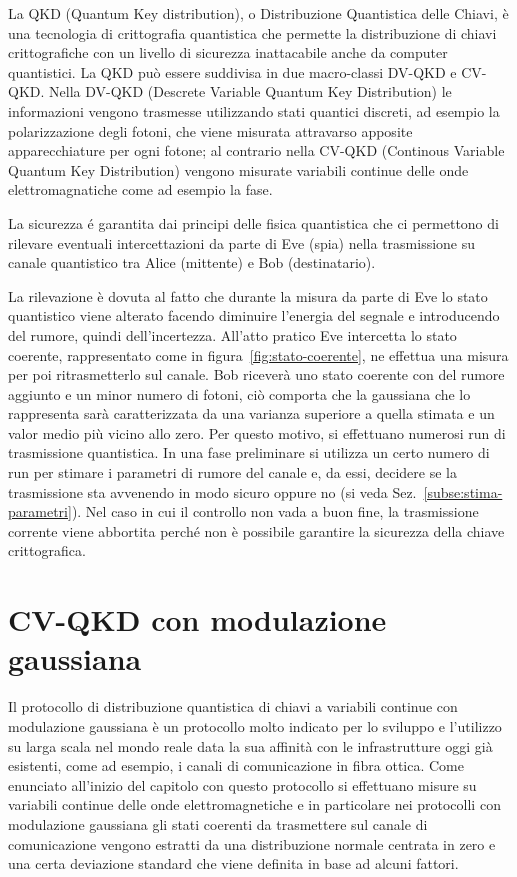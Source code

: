 La QKD (Quantum Key distribution), o Distribuzione Quantistica delle Chiavi, \`e una tecnologia di crittografia quantistica che permette la distribuzione di chiavi crittografiche con un livello di sicurezza inattacabile anche da computer quantistici. La QKD pu\`o essere suddivisa in due macro-classi DV-QKD e CV-QKD. Nella DV-QKD (Descrete Variable Quantum Key Distribution) le informazioni vengono trasmesse utilizzando stati quantici discreti, ad esempio la polarizzazione degli fotoni, che viene misurata attravarso apposite apparecchiature per ogni fotone; al contrario nella CV-QKD (Continous Variable Quantum Key Distribution) vengono misurate variabili continue delle onde elettromagnatiche come ad esempio la fase.

La sicurezza \'e garantita dai principi delle fisica quantistica che ci permettono di rilevare eventuali intercettazioni da parte di Eve (spia) nella trasmissione su canale quantistico tra Alice (mittente) e Bob (destinatario).

La rilevazione \`e dovuta al fatto che durante la misura da parte di Eve lo stato quantistico viene alterato facendo diminuire l'energia del segnale e introducendo del rumore, quindi dell'incertezza. All'atto pratico Eve intercetta lo stato coerente, rappresentato come in figura~\ref{fig:stato-coerente}, ne effettua una misura per poi ritrasmetterlo sul canale. Bob ricever\`a uno stato coerente con del rumore aggiunto e un minor numero di fotoni, ci\`o comporta che la gaussiana che lo rappresenta sar\`a caratterizzata da una varianza superiore a quella stimata e un valor medio pi\`u vicino allo zero. Per questo motivo, si effettuano numerosi run di trasmissione quantistica. In una fase preliminare si utilizza un certo numero di run per stimare i parametri di rumore del canale e, da essi, decidere se la trasmissione sta avvenendo in modo sicuro oppure no (si veda Sez.~\ref{subse:stima-parametri}). Nel caso in cui il controllo non vada a buon fine, la trasmissione  corrente viene abbortita perch\'e non \`e possibile garantire la sicurezza della chiave crittografica.

\section{CV-QKD con modulazione gaussiana}
Il protocollo di distribuzione quantistica di chiavi a variabili continue con modulazione gaussiana \`e un protocollo molto indicato per lo sviluppo e l'utilizzo su larga scala nel mondo reale data la sua affinit\`a con le infrastrutture oggi gi\`a esistenti, come ad esempio, i canali di comunicazione in fibra ottica. Come enunciato all'inizio del capitolo con questo protocollo si effettuano misure su variabili continue delle onde elettromagnetiche e in particolare nei protocolli con modulazione gaussiana gli stati coerenti da trasmettere sul canale di comunicazione vengono estratti da una distribuzione normale centrata in zero e una certa deviazione standard che viene definita in base ad alcuni fattori.

